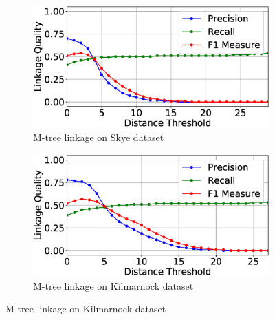 \documentclass{llncs}
\begin{document}
\begin{figure}
\centering
\begin{subfigure}{.5\textwidth}
  \centering
\includegraphics[width=\textwidth]{figures/plotLQ-skye-mtree}
\vspace{-6mm}
\caption{M-tree linkage on Skye dataset\label{skye-quality-mtree}}
\end{subfigure}%
\begin{subfigure}{.5\textwidth}
  \centering
\includegraphics[width=\textwidth]{figures/plotLQ-kilmarnock-mtree}
\vspace{-6mm}
\caption{M-tree linkage on Kilmarnock dataset\label{kilmarnock-quality-mtree}}
\end{subfigure} \vspace{5mm}


\end{figure}
\end{document}
